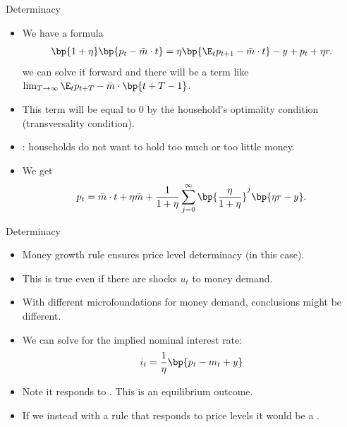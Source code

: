 \documentclass[11pt,xcolor={dvipsnames},aspectratio=159,hyperref={pdftex,pdfpagemode=UseNone,hidelinks,pdfdisplaydoctitle=true},usepdftitle=false]{beamer}
\begin{document}
            
        \begin{frame}{Determinacy}
            \begin{itemize}
                    \item We have a formula \begin{align*}
                        \bp{1+\eta} \bp{ p_t  - \bar{m} \cdot t  } =\eta \bp{\E_t p_{t+1} - \bar{m} \cdot t} - y + p_t + \eta r.
                    \end{align*}
                    we can solve it forward and there will be a term like $\lim_{T\rightarrow\infty} \E_t p_{t+T} - \bar{m} \cdot \bp{t+T-1} $.
                    \item This term will be equal to 0 by the household's optimality condition (transversality condition).
                    \item {}: households do not want to hold too much or too little money. 
                    \item We get \begin{align*}
                        p_t  = \bar{m}\cdot t + \eta \bar{m} + \frac{1}{1+\eta} \sum_{j=0}^\infty \bp{\frac{\eta}{1+\eta}}^j \bp{\eta r - y}.
                    \end{align*}
                \end{itemize}
            \end{frame}

            \begin{frame}{Determinacy}
                \begin{itemize}
                        \item Money growth rule ensures price level determinacy (in this case).
                        \item This is true even if there are shocks $u_t$ to money demand.
                        \item With different microfoundations for money demand, conclusions might be different.
                        \item We can solve for the implied nominal interest rate: \begin{align*}
                            i_t = \frac{1}{\eta}\bp{p_t - m_t + y}
                        \end{align*}
                        \item Note it responds to . This is an equilibrium outcome. 
                        \item If we instead  with a rule that responds to price levels it would be a .
                \end{itemize}
                \end{frame}
\end{document}
